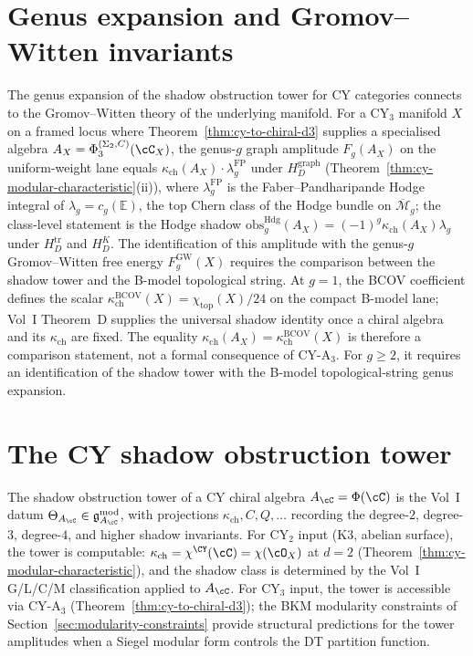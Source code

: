 \section{Genus expansion and Gromov--Witten invariants}
\label{sec:genus-gw}

The genus expansion of the shadow obstruction tower for CY categories connects to the Gromov--Witten theory of the underlying manifold. For a CY$_3$ manifold $X$ on a framed locus where Theorem~\ref{thm:cy-to-chiral-d3} supplies a specialised algebra $A_X=\Phi_3^{(\Sigma_2,C)}(\cC_X)$, the genus-$g$ graph amplitude $F_g(A_X)$ on the uniform-weight lane equals $\kappa_{\mathrm{ch}}(A_X)\cdot\lambda_g^{\mathrm{FP}}$ under $H_D^{\mathrm{graph}}$ (Theorem~\ref{thm:cy-modular-characteristic}(ii)), where $\lambda_g^{\mathrm{FP}}$ is the Faber--Pandharipande Hodge integral of $\lambda_g=c_g(\mathbb{E})$, the top Chern class of the Hodge bundle on $\overline{\mathcal{M}}_g$; the class-level statement is the Hodge shadow $\mathrm{obs}_g^{\mathrm{Hdg}}(A_X)=(-1)^g\kappa_{\mathrm{ch}}(A_X)\lambda_g$ under $H_D^{\mathrm{tr}}$ and $H_D^K$. The identification of this amplitude with the genus-$g$ Gromov--Witten free energy $F_g^{\mathrm{GW}}(X)$ requires the comparison between the shadow tower and the B-model topological string. At $g=1$, the BCOV coefficient defines the scalar $\kappa_{\mathrm{ch}}^{\mathrm{BCOV}}(X)=\chi_{\mathrm{top}}(X)/24$ on the compact B-model lane; Vol~I Theorem~D supplies the universal shadow identity once a chiral algebra and its $\kappa_{\mathrm{ch}}$ are fixed. The equality $\kappa_{\mathrm{ch}}(A_X)=\kappa_{\mathrm{ch}}^{\mathrm{BCOV}}(X)$ is therefore a comparison statement, not a formal consequence of CY-A$_3$. For $g\geq2$, it requires an identification of the shadow tower with the B-model topological-string genus expansion.

\section{The CY shadow obstruction tower}
\label{sec:cy-shadow-tower}

The shadow obstruction tower of a CY chiral algebra $A_\cC = \Phi(\cC)$ is the Vol~I datum $\Theta_{A_\cC} \in \mathfrak{g}^{\mathrm{mod}}_{A_\cC}$, with projections $\kappa_{\mathrm{ch}}, C, Q, \ldots$ recording the degree-$2$, degree-$3$, degree-$4$, and higher shadow invariants. For CY$_2$ input (K3, abelian surface), the tower is computable: $\kappa_{\mathrm{ch}} = \chi^{\CY}(\cC) = \chi(\cO_X)$ at $d = 2$ (Theorem~\ref{thm:cy-modular-characteristic}), and the shadow class is determined by the Vol~I G/L/C/M classification applied to $A_\cC$. For CY$_3$ input, the tower is accessible via CY-A$_3$ (Theorem~\ref{thm:cy-to-chiral-d3}); the BKM modularity constraints of Section~\ref{sec:modularity-constraints} provide structural predictions for the tower amplitudes when a Siegel modular form controls the DT partition function.

